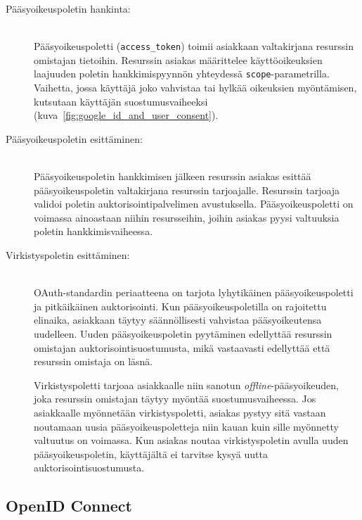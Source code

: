 \documentclass[finnish,gradu]{tktltiki}
\begin{document}
  \newpage
  \begin{description}

  \item[Pääsyoikeuspoletin hankinta:] \hfill \\
  Pääsyoikeuspoletti (\verb!access_token!) toimii asiakkaan valtakirjana resurssin omistajan tietoihin. Resurssin asiakas määrittelee käyttöoikeuksien laajuuden poletin hankkimispyynnön yhteydessä \verb!scope!-parametrilla. Vaihetta, jossa käyttäjä joko vahvistaa tai hylkää oikeuksien myöntämisen, kutsutaan käyttäjän suostumusvaiheeksi (kuva~\ref{fig:google_id_and_user_consent}).

  \item[Pääsyoikeuspoletin esittäminen:] \hfill \\
  Pääsyoikeuspoletin hankkimisen jälkeen resurssin asiakas esittää pääsyoikeuspoletin valtakirjana resurssin tarjoajalle. Resurssin tarjoaja validoi poletin auktorisointipalvelimen avustuksella. Pääsyoikeuspoletti on voimassa ainoastaan niihin resursseihin, joihin asiakas pyysi valtuuksia poletin hankkimisvaiheessa.

  \item[Virkistyspoletin esittäminen:] \hfill \\
  OAuth-standardin periaatteena on tarjota lyhytikäinen pääsyoikeuspoletti ja pitkäikäinen auktorisointi. Kun pääsyoikeuspoletilla on rajoitettu elinaika, asiakkaan täytyy säännöllisesti vahvistaa pääsyoikeutensa uudelleen. Uuden pääsyoikeuspoletin pyytäminen edellyttää resurssin omistajan auktorisointisuostumusta, mikä vastaavasti edellyttää että resurssin omistaja on läsnä.

  Virkistyspoletti tarjoaa asiakkaalle niin sanotun \emph{offline}-pääsyoikeuden, joka resurssin omistajan täytyy myöntää suostumusvaiheessa. Jos asiakkaalle myönnetään virkistyspoletti, asiakas pystyy sitä vastaan noutamaan uusia pääsyoikeuspoletteja niin kauan kuin sille myönnetty valtuutus on voimassa. Kun asiakas noutaa virkistyspoletin avulla uuden pääsyoikeuspoletin, käyttäjältä ei tarvitse kysyä uutta auktorisointisuostumusta.

  \end{description}



  \newpage
  \subsection{OpenID Connect} %
  \label{sub:openid_connect}
\end{document}
